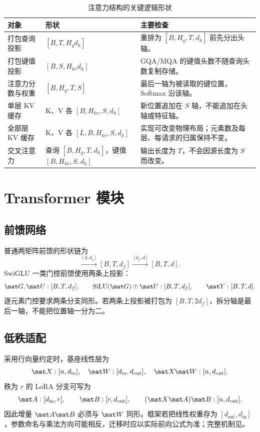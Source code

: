 \documentclass[../textbook.tex]{subfiles}
\begin{document}
\begin{table}[htbp]
\centering
\caption{注意力结构的关键逻辑形状}\label{tab:appendix-attention-shapes}
\begin{tabularx}{\linewidth}{p{.22\linewidth}p{.28\linewidth}X}
\toprule
对象 & 形状 & 主要检查\\\midrule
打包查询投影 & $[B,T,H_qd_h]$ & 重排为 $[B,H_q,T,d_h]$ 前先分出头轴。\\
打包键值投影 & $[B,S,H_{kv}d_h]$ & GQA/MQA 的键值头数不随查询头数复制存储。\\
注意力分数与权重 & $[B,H_q,T,S]$ & 最后一轴为被读取的键位置，Softmax 沿该轴。\\
单层 KV 缓存 & K、V 各 $[B,H_{kv},S,d_h]$ & 新位置追加在 $S$ 轴，不能追加在头轴或特征轴。\\
全部层 KV 缓存 & K、V 各 $[L,B,H_{kv},S,d_h]$ & 实现可改变物理布局；元素数及每层、每请求的归属保持不变。\\
交叉注意力 & 查询 $[B,H_q,T,d_h]$，键值 $[B,H_{kv},S,d_h]$ & 输出长度为 $T$，不会因源长度为 $S$ 而改变。\\
\bottomrule
\end{tabularx}
\end{table}

\section{Transformer 模块}

\subsection{前馈网络}

普通两矩阵前馈的形状链为
\begin{equation}
 [B,T,d]\xrightarrow{[d,d_f]}[B,T,d_f]
 \xrightarrow{[d_f,d]}[B,T,d].
\end{equation}
SwiGLU 一类门控前馈使用两条上投影：
\begin{equation}
 \mat G,\mat U:[B,T,d_f],\qquad
 \operatorname{SiLU}(\mat G)\odot\mat U:[B,T,d_f],\qquad
 \mat Y:[B,T,d].
\end{equation}
逐元素门控要求两条分支同形。若两条上投影被打包为 $[B,T,2d_f]$，拆分轴是最后一轴，不能把位置轴一分为二。

\subsection{低秩适配}

采用行向量约定时，基座线性层为
\begin{equation}
 \mat X:[n,d_{\mathrm{in}}],\quad
 \mat W:[d_{\mathrm{in}},d_{\mathrm{out}}],\quad
 \mat X\mat W:[n,d_{\mathrm{out}}].
\end{equation}
秩为 $r$ 的 LoRA 分支可写为
\begin{equation}
 \mat A:[d_{\mathrm{in}},r],\qquad
 \mat B:[r,d_{\mathrm{out}}],\qquad
 (\mat X\mat A)\mat B:[n,d_{\mathrm{out}}].
\end{equation}
因此增量 $\mat A\mat B$ 必须与 $\mat W$ 同形。框架若把线性权重存为 $[d_{\mathrm{out}},d_{\mathrm{in}}]$，参数命名与乘法方向可能相反，迁移时应以实际前向公式为准；完整机制见。
\end{document}
